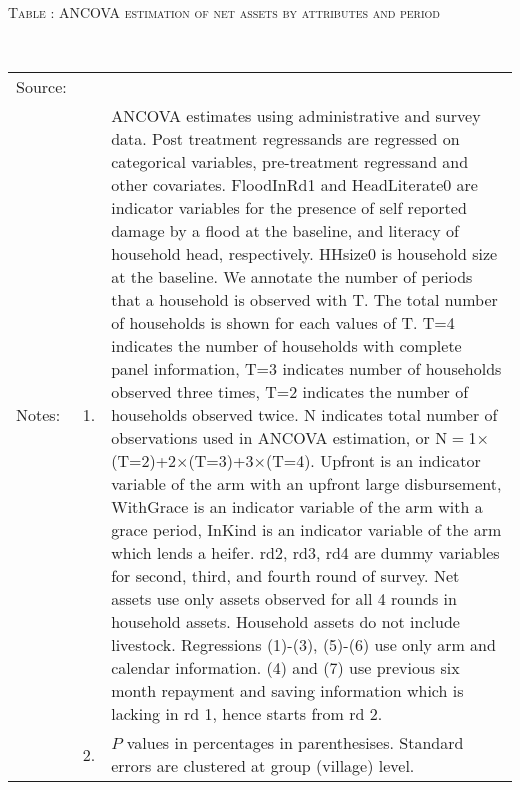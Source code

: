 \hspace{-1cm}\begin{minipage}[t]{14cm}
\hfil\textsc{\normalsize Table \thetable: ANCOVA estimation of net assets by attributes and period\label{tab ANCOVA narrow net assets timevarying attributes}}\\
\setlength{\tabcolsep}{1pt}
\setlength{\baselineskip}{8pt}
\renewcommand{\arraystretch}{.55}
\hfil{}\\
\renewcommand{\arraystretch}{.8}
\setlength{\tabcolsep}{1pt}
\begin{tabular}{>{\hfill\scriptsize}p{1cm}<{}>{\hfill\scriptsize}p{.25cm}<{}>{\scriptsize}p{12cm}<{\hfill}}
Source:& \multicolumn{2}{l}{\scriptsize Estimated with GUK administrative and survey data.}\\
Notes: & 1. & ANCOVA estimates using administrative and survey data. Post treatment regressands are regressed on categorical variables, pre-treatment regressand and other covariates. \textsf{FloodInRd1} and \textsf{HeadLiterate0} are indicator variables for the presence of self reported damage by a flood at the baseline, and literacy of household head, respectively. \textsf{HHsize0} is household size at the baseline. We annotate the number of periods that a household is observed with \textsf{T}. The total number of households is shown for each values of \textsf{T}. \textsf{T=4} indicates the number of households with complete panel information, \textsf{T=3} indicates number of households observed three times, \textsf{T=2} indicates the number of households observed twice. \textsf{N} indicates total number of observations used in ANCOVA estimation, or \textsf{N$=$1$\times$(T=2)+2$\times$(T=3)+3$\times$(T=4)}.  \textsf{Upfront} is an indicator variable of the arm with an upfront large disbursement, \textsf{WithGrace} is an indicator variable of the arm with a grace period, \textsf{InKind} is an indicator variable of the arm which lends a heifer. \textsf{rd2, rd3, rd4} are dummy variables for second, third, and fourth round of survey. Net assets use only assets observed for all 4 rounds in household assets. Household assets do not include livestock. Regressions (1)-(3), (5)-(6) use only arm and calendar information. (4) and (7) use previous six month repayment and saving information which is lacking in rd 1, hence starts from rd 2.\\
& 2. & $P$ values in percentages in parenthesises. Standard errors are clustered at group (village) level.
\end{tabular}
\end{minipage}





